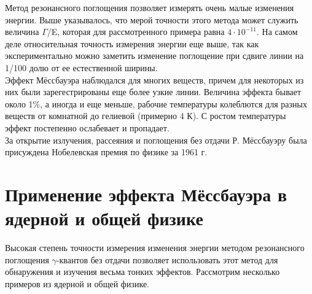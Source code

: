 \documentclass{article}
\begin{document}
\indent Метод резонансного поглощения позволяет измерять очень малые изменения энергии. Выше указывалось, что мерой точности этого метода может служить величина $\Gamma$/E, которая для рассмотренного примера равна $4\cdot10^{-11}$. На самом деле относительная точность измерения энергии еще выше, так как экспериментально можно заметить изменение поглощение при сдвиге линии на 1/100 долю от ее естественной ширины.
\\
\indent Эффект Мёссбауэра наблюдался для многих веществ, причем для некоторых из них были зарегестрированы еще более узкие линии. Величина эффекта бывает около 1$\%$, а иногда и еще меньше, рабочие температуры колеблются для разных веществ от комнатной до гелиевой (примерно 4 К). С ростом температуры эффект постепенно ослабевает и пропадает.
\\
\indent За открытие излучения, рассеяния и поглощения без отдачи Р. Мёссбауэру была присуждена Нобелевская премия по физике за 1961 г.

\section{Применение эффекта Мёссбауэра в ядерной и общей физике}
\hspace{12pt} Высокая степень точности измерения изменения энергии методом резонансного поглощения $\gamma$-квантов без отдачи позволяет использовать этот метод для обнаружения и изучения весьма тонких эффектов. Рассмотрим несколько примеров из ядерной и общей физике.
\end{document}
